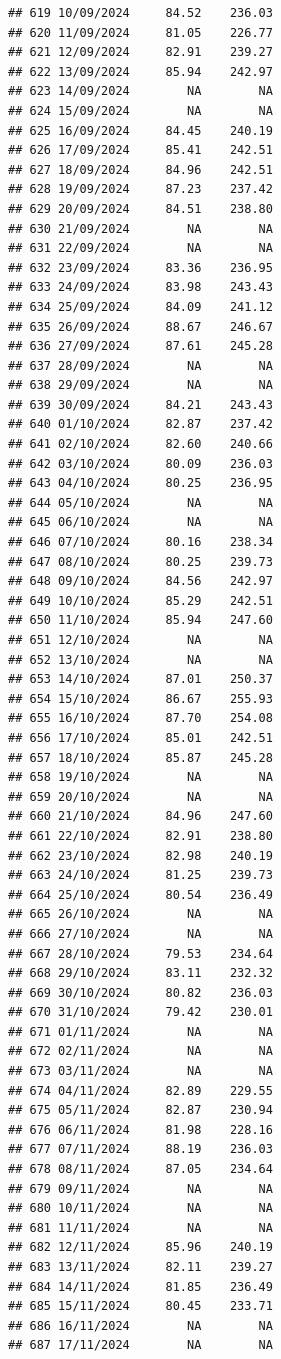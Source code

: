 \documentclass[
]{article}
\begin{document}
\begin{verbatim}
## 619 10/09/2024     84.52    236.03
## 620 11/09/2024     81.05    226.77
## 621 12/09/2024     82.91    239.27
## 622 13/09/2024     85.94    242.97
## 623 14/09/2024        NA        NA
## 624 15/09/2024        NA        NA
## 625 16/09/2024     84.45    240.19
## 626 17/09/2024     85.41    242.51
## 627 18/09/2024     84.96    242.51
## 628 19/09/2024     87.23    237.42
## 629 20/09/2024     84.51    238.80
## 630 21/09/2024        NA        NA
## 631 22/09/2024        NA        NA
## 632 23/09/2024     83.36    236.95
## 633 24/09/2024     83.98    243.43
## 634 25/09/2024     84.09    241.12
## 635 26/09/2024     88.67    246.67
## 636 27/09/2024     87.61    245.28
## 637 28/09/2024        NA        NA
## 638 29/09/2024        NA        NA
## 639 30/09/2024     84.21    243.43
## 640 01/10/2024     82.87    237.42
## 641 02/10/2024     82.60    240.66
## 642 03/10/2024     80.09    236.03
## 643 04/10/2024     80.25    236.95
## 644 05/10/2024        NA        NA
## 645 06/10/2024        NA        NA
## 646 07/10/2024     80.16    238.34
## 647 08/10/2024     80.25    239.73
## 648 09/10/2024     84.56    242.97
## 649 10/10/2024     85.29    242.51
## 650 11/10/2024     85.94    247.60
## 651 12/10/2024        NA        NA
## 652 13/10/2024        NA        NA
## 653 14/10/2024     87.01    250.37
## 654 15/10/2024     86.67    255.93
## 655 16/10/2024     87.70    254.08
## 656 17/10/2024     85.01    242.51
## 657 18/10/2024     85.87    245.28
## 658 19/10/2024        NA        NA
## 659 20/10/2024        NA        NA
## 660 21/10/2024     84.96    247.60
## 661 22/10/2024     82.91    238.80
## 662 23/10/2024     82.98    240.19
## 663 24/10/2024     81.25    239.73
## 664 25/10/2024     80.54    236.49
## 665 26/10/2024        NA        NA
## 666 27/10/2024        NA        NA
## 667 28/10/2024     79.53    234.64
## 668 29/10/2024     83.11    232.32
## 669 30/10/2024     80.82    236.03
## 670 31/10/2024     79.42    230.01
## 671 01/11/2024        NA        NA
## 672 02/11/2024        NA        NA
## 673 03/11/2024        NA        NA
## 674 04/11/2024     82.89    229.55
## 675 05/11/2024     82.87    230.94
## 676 06/11/2024     81.98    228.16
## 677 07/11/2024     88.19    236.03
## 678 08/11/2024     87.05    234.64
## 679 09/11/2024        NA        NA
## 680 10/11/2024        NA        NA
## 681 11/11/2024        NA        NA
## 682 12/11/2024     85.96    240.19
## 683 13/11/2024     82.11    239.27
## 684 14/11/2024     81.85    236.49
## 685 15/11/2024     80.45    233.71
## 686 16/11/2024        NA        NA
## 687 17/11/2024        NA        NA

\end{verbatim}
\end{document}
